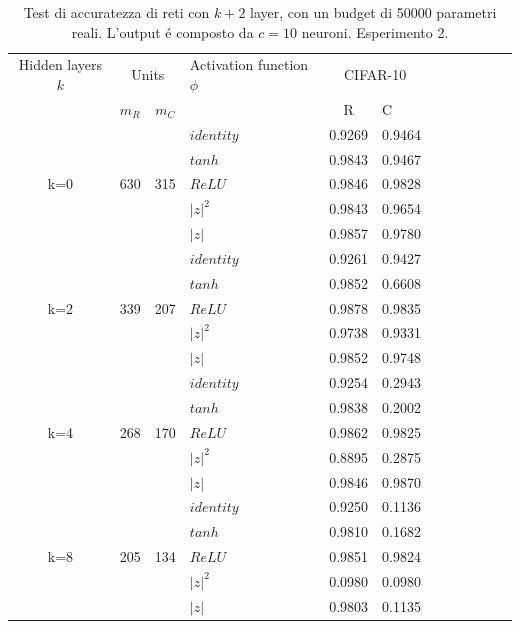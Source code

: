 \documentclass[a4paper,10pt]{article}
\begin{document}
 \begin{table}
  \centering
  \begin{tabular}{cp{} cp{} cp{}   cp{} cp{} cp{}}
   \cline{1-6}
   Hidden layers $k$ & \multicolumn{2}{c}{Units} $p_R$ & Activation function $\phi$ & \multicolumn{2}{c}{CIFAR-10}\\
   \cline{2-3} \cline{5-6}
   & $m_R$ & $m_C$ & & R & C \\
   \cline{1-6}
   & & & $identity$ & 0.9269 & 0.9464 \\
   \cline{4-6}
   & & & $tanh$ & 0.9843 & 0.9467 \\
   \cline{4-6}
   k=0 & 630 & 315 & $ReLU$ & 0.9846 & 0.9828 \\
   \cline{4-6}
   & & & $|z|^2$ & 0.9843 & 0.9654 \\
   \cline{4-6}
   & & & $|z|$ & 0.9857 & 0.9780 \\
   \cline{1-6}
   
   \cline{1-6}
   & & & $identity$ & 0.9261 & 0.9427 \\
   \cline{4-6}
   & & & $tanh$ & 0.9852 & 0.6608 \\
   \cline{4-6}
   k=2 & 339 & 207 & $ReLU$ & 0.9878 & 0.9835 \\
   \cline{4-6}
   & & & $|z|^2$ & 0.9738 & 0.9331 \\
   \cline{4-6}
   & & & $|z|$ & 0.9852 & 0.9748 \\
   \cline{1-6}
   
   \cline{1-6}
   & & & $identity$ & 0.9254 & 0.2943 \\
   \cline{4-6}
   & & & $tanh$ & 0.9838 & 0.2002 \\
   \cline{4-6}
   k=4 & 268 & 170 & $ReLU$ & 0.9862 & 0.9825 \\
   \cline{4-6}
   & & & $|z|^2$ & 0.8895 & 0.2875 \\
   \cline{4-6}
   & & & $|z|$ & 0.9846 & 0.9870 \\
   \cline{1-6}
   
   \cline{1-6}
   & & & $identity$ & 0.9250 & 0.1136 \\
   \cline{4-6}
   & & & $tanh$ & 0.9810 & 0.1682 \\
   \cline{4-6}
   k=8 & 205 & 134 & $ReLU$ & 0.9851 & 0.9824 \\
   \cline{4-6}
   & & & $|z|^2$ & 0.0980 & 0.0980 \\
   \cline{4-6}
   & & & $|z|$ & 0.9803 & 0.1135 \\
   \cline{1-6}
      
  \end{tabular}
  \caption{Test di accuratezza di reti con $k+2$ layer, con un budget di 50000 parametri reali. L'output \'e composto da $c=10$ neuroni. Esperimento 2.}
  \label{CIFAR-102Tab}
 \end{table}
 
\end{document}
